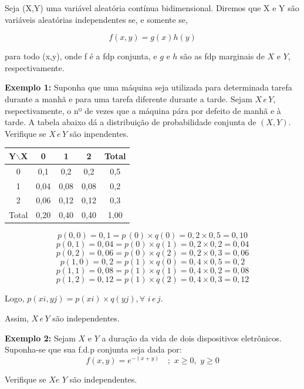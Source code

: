 \documentclass[a4paper,12pt]{report}
\begin{document}
{Seja (X,Y) uma variável aleatória contínua bidimensional. Diremos
que X e Y são variáveis aleatórias independentes se, e somente se,

\begin{equation}\label{}
    f(x,y)=g(x)h(y)
\end{equation}

para todo (x,y), onde f é a fdp conjunta, e $g$ e $h$ são as fdp
marginais de $X$ e $Y$, respectivamente.\vskip0.3cm



{\bf Exemplo 1:} Suponha que uma máquina seja utilizada para
determinada tarefa durante a manhã e para uma tarefa diferente
durante a tarde. Sejam $X\, e\, Y $, rsepectivamente, o nº de
vezes que a máquina pára por defeito de manhã e à tarde. A tabela
abaixo dá a distribuição de probabilidade conjunta de $(X,Y)$.
Verifique se $X\,e\, Y$ são inpendentes.


\begin{center}
\begin{tabular}{c|ccc|c}
  \hline\hline
  Y$\backslash$X & 0 & 1 & 2 & Total \\
  \hline
  0 & 0,1 & 0,2 & 0,2 & 0,5 \\
  1 & 0,04 & 0,08 & 0,08 & 0,2 \\
  2 & 0,06 & 0,12 & 0,12 & 0,3 \\
  \hline
  Total & 0,20 & 0,40 & 0,40 & 1,00 \\
  \hline\hline
\end{tabular}
\end{center}

$$p(0,0)= 0,1= p\,(0)\times  q(0)= 0,2\times  0,5 = 0,10$$
$$p(0,1)=0,04= p(0)\times  q(1)= 0,2\times  0,2 = 0,04$$
$$p(0,2)=0,06= p(0)\times  q(2)= 0,2\times  0,3 = 0,06$$
$$p(1,0)= 0,2= p(1)\times  q(0)= 0,4\times  0,5 = 0,2$$
$$p(1,1)= 0,08= p(1)\times  q(1)= 0,4\times  0,2 = 0,08$$
$$p(1,2)=0,12= p(1)\times  q(2)= 0,4\times  0,3 = 0,12$$

\par Logo, $p(xi,yj)= p(xi)\times  q(yj), \forall\,\, i\, e\, j$.
\par Assim, $X\, e\, Y$ são independentes.\vskip0.3cm



{\bf Exemplo 2:} Sejam $X$ e $Y$ a duração da vida de dois
dispositivos eletrônicos. Suponha-se que sua f.d.p conjunta seja
dada por:
$$f(x,y)= e^{-(x+y)}\quad   ;\,\, x \geq 0,\,\, y\geq 0$$
\par Verifique se $X e\,\, Y$ são independentes.
\vspace{0,2cm}

}
\end{document}
